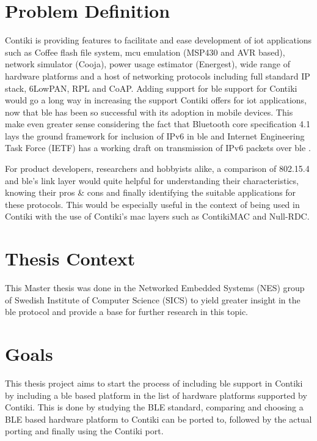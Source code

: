 \section{Problem Definition}

Contiki is providing features to facilitate and ease development of \gls{iot} applications such as Coffee flash file system, \gls{mcu} emulation (MSP430 and AVR based), network simulator (Cooja), power usage estimator (Energest), wide range of hardware platforms and a host of networking protocols including full standard IP stack, 6LowPAN, RPL and CoAP. Adding support for \gls{ble} support for Contiki would go a long way in increasing the support Contiki offers for \gls{iot} applications, now that \gls{ble} has been so successful with its adoption in mobile devices. This make even greater sense considering the fact that Bluetooth core specification 4.1 lays the ground framework for inclusion of IPv6 in \gls{ble} \cite{4.0to4.1} and Internet Engineering Task Force (IETF)  has a working draft on transmission of IPv6 packets over \gls{ble} \cite{ieftIPv6Draft}.

For product developers, researchers and hobbyists alike, a comparison of 802.15.4 and \gls{ble}'s link layer would quite helpful for understanding their characteristics, knowing their pros \& cons and finally identifying the suitable applications for these protocols. This would be especially useful in the context of being used in Contiki with the use of Contiki's \gls{mac} layers such as ContikiMAC and Null-RDC. 


\section{Thesis Context}

This Master thesis was done in the Networked Embedded Systems (NES) group of Swedish Institute of Computer Science (SICS) to yield greater insight in the \gls{ble} protocol and provide a base for further research in this topic.

\section{Goals}

This thesis project aims to start the process of including \gls{ble} support in Contiki by including a \gls{ble} based platform in the list of hardware platforms supported by Contiki. This is done by studying the BLE standard, comparing and choosing a BLE based hardware platform to Contiki can be ported to, followed by the actual porting and finally using the Contiki port. 

